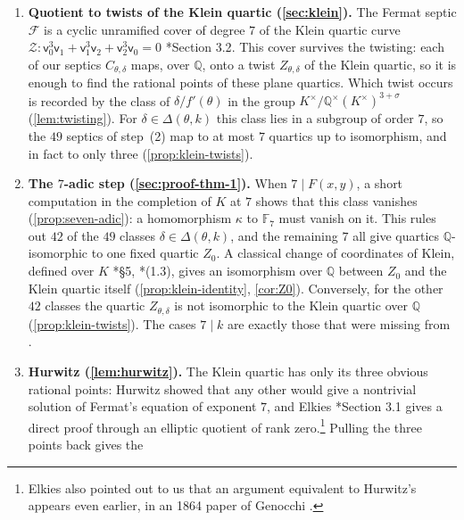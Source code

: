 \documentclass[12pt]{amsart}
\newcommand{\F}{{\mathbb F}}
\newcommand{\Q}{\mathbb{Q}}
\newcommand{\Qbar}{{\overline{\Q}}}
\newcommand{\calF}{{\mathcal F}}
\newcommand{\calZ}{{\mathcal Z}}
\newcommand{\sfu}{\mathsf{u}}
\newcommand{\sfv}{\mathsf{v}}
\numberwithin{equation}{section}
\theoremstyle{definition}
\begin{document}
\begin{enumerate}[leftmargin=*, itemsep=0.4em]
  So the rational points of the curves $C_{\theta,\delta}$ account for all the
  solutions. Over $K$ each of these curves becomes a diagonal
  septic, a twist of the Fermat curve $\calF\colon \sfu_0^7 + \sfu_1^7 + \sfu_2^7
  = 0$ to which it is isomorphic over $\Qbar$. Remarkably, all six pairs $(F,k)$
  that arise in \cref{sec:equations} lead to the same $49$ twists of the Fermat
  septic.
\item \textbf{Quotient to twists of the Klein quartic (\cref{sec:klein}).} The
  Fermat septic $\calF$ is a cyclic unramified cover of degree $7$ of the
  Klein quartic curve
  $\calZ \colon \sfv_0^3\sfv_1 + \sfv_1^3\sfv_2 + \sfv_2^3\sfv_0= 0$
  \cite{Elkies-99}*{Section 3.2}. This cover survives the twisting: each of our
  septics $C_{\theta,\delta}$ maps, over $\Q$, onto a twist $Z_{\theta,\delta}$ of the Klein
  quartic, so it is enough to find the rational points of these plane quartics.
  Which twist occurs is recorded by the class of $\delta/f'(\theta)$ in the
  group $K^{\times}/\Q^{\times}(K^{\times})^{3+\sigma}$
  (\cref{lem:twisting}). For $\delta \in \Delta(\theta,k)$ this class lies in a
  subgroup of order $7$, so the $49$ septics of step~(2) map to at most $7$
  quartics up to isomorphism, and in fact to only three
  (\cref{prop:klein-twists}).
\item \textbf{The $7$-adic step (\cref{sec:proof-thm-1}).} When
  $7 \mid F(x,y)$, a short computation in the completion of $K$ at $7$ shows that
  this class vanishes (\cref{prop:seven-adic}): a homomorphism $\kappa$ to
  $\F_7$ must vanish on it. This rules out $42$ of the $49$ classes
  $\delta \in \Delta(\theta,k)$, and the remaining $7$ all give quartics $\Q$-isomorphic
  to one fixed quartic $Z_0$. A classical change of coordinates of Klein,
  defined over $K$ \cite{Klein-1879}*{\S 5}, \cite{Elkies-99}*{(1.3)},
  gives an isomorphism over $\Q$ between $Z_0$ and the Klein quartic itself
  (\cref{prop:klein-identity}, \cref{cor:Z0}). Conversely, for the other $42$
  classes the quartic $Z_{\theta,\delta}$ is not isomorphic to the Klein quartic
  over $\Q$ (\cref{prop:klein-twists}).
  The cases $7 \mid k$ are exactly those that were missing from \cite{Furio--Lombardo26}.
\item \textbf{Hurwitz (\cref{lem:hurwitz}).} The Klein quartic has only its
  three obvious rational points: Hurwitz \cite{Hurwitz-08} showed that any other
  would give a nontrivial solution of Fermat's equation of exponent $7$, and
  Elkies \cite{Elkies-99}*{Section 3.1} gives a direct proof through an
  elliptic quotient of rank zero.\footnote{Elkies also pointed out to us that an argument equivalent to Hurwitz's appears even earlier, in an 1864 paper of Genocchi \cite{Genocchi-64}.} Pulling the three points back gives the

\end{enumerate}
\end{document}
